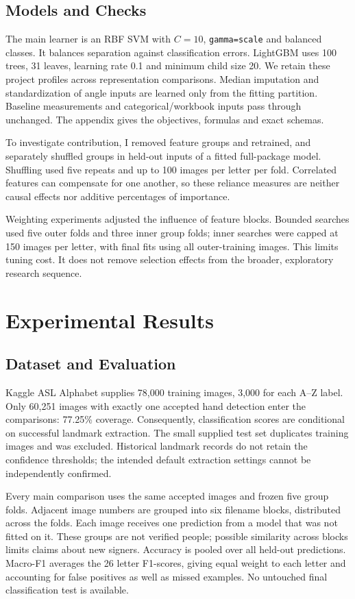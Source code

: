 \documentclass{article}
\begin{document}
\subsection{Models and Checks}
The main learner is an RBF SVM with $C=10$, \texttt{gamma=scale} and balanced classes. It balances separation against classification errors. LightGBM uses 100 trees, 31 leaves, learning rate 0.1 and minimum child size 20. We retain these project profiles across representation comparisons. Median imputation and standardization of angle inputs are learned only from the fitting partition. Baseline measurements and categorical/workbook inputs pass through unchanged. The appendix gives the objectives, formulas and exact schemas.

To investigate contribution, I removed feature groups and retrained, and separately shuffled groups in held-out inputs of a fitted full-package model. Shuffling used five repeats and up to 100 images per letter per fold. Correlated features can compensate for one another, so these reliance measures are neither causal effects nor additive percentages of importance.

Weighting experiments adjusted the influence of feature blocks. Bounded searches used five outer folds and three inner group folds; inner searches were capped at 150 images per letter, with final fits using all outer-training images. This limits tuning cost. It does not remove selection effects from the broader, exploratory research sequence.

\section{Experimental Results}
\subsection{Dataset and Evaluation}
Kaggle ASL Alphabet supplies 78,000 training images, 3,000 for each A--Z label. Only 60,251 images with exactly one accepted hand detection enter the comparisons: 77.25\% coverage. Consequently, classification scores are conditional on successful landmark extraction. The small supplied test set duplicates training images and was excluded. Historical landmark records do not retain the confidence thresholds; the intended default extraction settings cannot be independently confirmed.

Every main comparison uses the same accepted images and frozen five group folds. Adjacent image numbers are grouped into six filename blocks, distributed across the folds. Each image receives one prediction from a model that was not fitted on it. These groups are not verified people; possible similarity across blocks limits claims about new signers. Accuracy is pooled over all held-out predictions. Macro-F1 averages the 26 letter F1-scores, giving equal weight to each letter and accounting for false positives as well as missed examples. No untouched final classification test is available.
\end{document}
